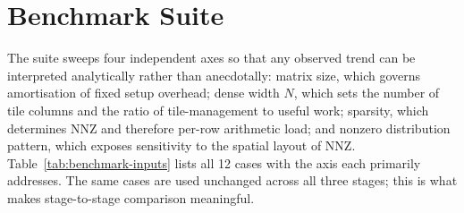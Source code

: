 \section{Benchmark Suite}
\label{sec:bench-design}

The suite sweeps four independent axes so that any observed trend can
be interpreted analytically rather than anecdotally: matrix size, which
governs amortisation of fixed setup overhead; dense width $N$, which
sets the number of tile columns and the ratio of tile-management to
useful work; sparsity, which determines NNZ and therefore per-row
arithmetic load; and nonzero distribution pattern, which exposes
sensitivity to the spatial layout of NNZ. Table~\ref{tab:benchmark-inputs}
lists all 12 cases with the axis each primarily addresses. The same
cases are used unchanged across all three stages; this is what makes
stage-to-stage comparison meaningful.

